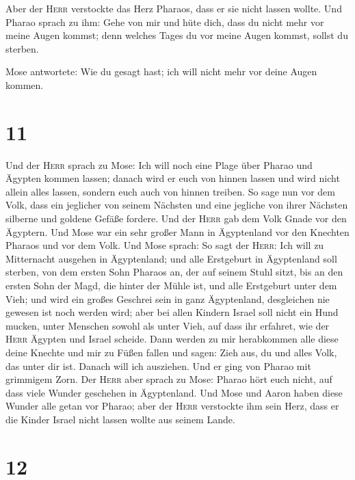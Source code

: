  Aber der \textsc{Herr} verstockte das Herz Pharaos, dass
er sie nicht lassen wollte.  Und Pharao sprach zu ihm:
Gehe von mir und hüte dich, dass du nicht mehr vor meine Augen kommst;
denn welches Tages du vor meine Augen kommst, sollst du sterben.

 Mose antwortete: Wie du gesagt hast; ich will nicht mehr
vor deine Augen kommen.

\hypertarget{section-10}{%
\section{11}\label{section-10}}

 Und der \textsc{Herr} sprach zu Mose: Ich will noch eine
Plage über Pharao und Ägypten kommen lassen; danach wird er euch von
hinnen lassen und wird nicht allein alles lassen, sondern euch auch von
hinnen treiben.  So sage nun vor dem Volk, dass ein
jeglicher von seinem Nächsten und eine jegliche von ihrer Nächsten
silberne und goldene Gefäße fordere.  Und der
\textsc{Herr} gab dem Volk Gnade vor den Ägyptern. Und Mose war ein sehr
großer Mann in Ägyptenland vor den Knechten Pharaos und vor dem Volk.
 Und Mose sprach: So sagt der \textsc{Herr}: Ich will zu
Mitternacht ausgehen in Ägyptenland;  und alle Erstgeburt
in Ägyptenland soll sterben, von dem ersten Sohn Pharaos an, der auf
seinem Stuhl sitzt, bis an den ersten Sohn der Magd, die hinter der
Mühle ist, und alle Erstgeburt unter dem Vieh;  und wird
ein großes Geschrei sein in ganz Ägyptenland, desgleichen nie gewesen
ist noch werden wird;  aber bei allen Kindern Israel soll
nicht ein Hund mucken, unter Menschen sowohl als unter Vieh, auf dass
ihr erfahret, wie der \textsc{Herr} Ägypten und Israel scheide.
 Dann werden zu mir herabkommen alle diese deine Knechte
und mir zu Füßen fallen und sagen: Zieh aus, du und alles Volk, das
unter dir ist. Danach will ich ausziehen. Und er ging von Pharao mit
grimmigem Zorn.  Der \textsc{Herr} aber sprach zu Mose:
Pharao hört euch nicht, auf dass viele Wunder geschehen in Ägyptenland.
 Und Mose und Aaron haben diese Wunder alle getan vor
Pharao; aber der \textsc{Herr} verstockte ihm sein Herz, dass er die
Kinder Israel nicht lassen wollte aus seinem Lande.

\hypertarget{section-11}{%
\section{12}\label{section-11}}

